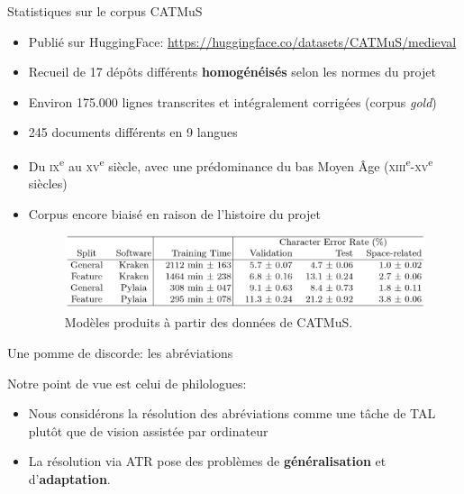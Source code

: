 \documentclass[11pt,aspectratio=169]{beamer}
\let\cite\parencite
\begin{document}
\begin{frame}{Statistiques sur le corpus CATMuS}
\begin{itemize}
\item Publié sur HuggingFace: \url{https://huggingface.co/datasets/CATMuS/medieval}
\item Recueil de 17 dépôts différents \textbf{homogénéisés} selon les normes du projet
\item Environ 175.000 lignes transcrites et intégralement corrigées (corpus \textit{gold})
\item 245 documents différents en 9 langues
\item Du \textsc{ix}\textsuperscript{e} au \textsc{xv}\textsuperscript{e} siècle, avec une prédominance du bas Moyen Âge (\textsc{xiii}\textsuperscript{e}-\textsc{xv}\textsuperscript{e} siècles)
\item Corpus encore biaisé en raison de l'histoire du projet
\pause\begin{figure}
    \includegraphics[width=.8\textwidth]{img/training_results.png}
\caption{Modèles produits à partir des données de CATMuS. \cite[16]{clerice_CATMuSMedievalMultilingual_2024a}}
\end{figure}
\end{itemize}
\end{frame}


\begin{frame}{Une pomme de discorde: les abréviations}

\color{black}Notre point de vue est celui de philologues:
\begin{itemize}
\item Nous considérons la résolution des abréviations comme une tâche de TAL plutôt que de vision assistée par ordinateur \cite{clerice_CATMuSMedievalMultilingual_2024a}
\item La résolution via ATR pose des problèmes de \textbf{généralisation} et d'\textbf{adaptation}.
\end{itemize}
\end{frame}
\end{document}
